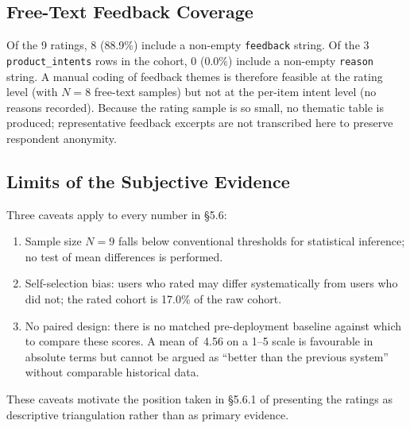 \subsection{Free-Text Feedback Coverage}
\label{subsec:feedback_coverage}

Of the 9 ratings, 8 (88.9\%) include a non-empty \texttt{feedback} string. Of the 3 \texttt{product\_intents} rows in the cohort, 0 (0.0\%) include a non-empty \texttt{reason} string. A manual coding of feedback themes is therefore feasible at the rating level (with $N=8$ free-text samples) but not at the per-item intent level (no reasons recorded). Because the rating sample is so small, no thematic table is produced; representative feedback excerpts are not transcribed here to preserve respondent anonymity.

\subsection{Limits of the Subjective Evidence}
\label{subsec:subjective_limits}

Three caveats apply to every number in §5.6:

\begin{enumerate}
    \item Sample size $N=9$ falls below conventional thresholds for statistical inference; no test of mean differences is performed.
    \item Self-selection bias: users who rated may differ systematically from users who did not; the rated cohort is 17.0\% of the raw cohort.
    \item No paired design: there is no matched pre-deployment baseline against which to compare these scores. A mean of~4.56 on a 1--5 scale is favourable in absolute terms but cannot be argued as ``better than the previous system'' without comparable historical data.
\end{enumerate}

These caveats motivate the position taken in §5.6.1 of presenting the ratings as descriptive triangulation rather than as primary evidence.
